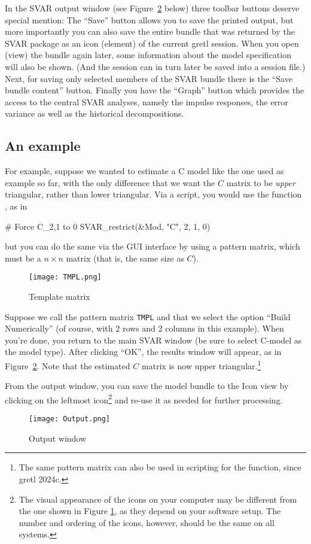 \documentclass[a4paper,10pt]{article}
\newcommand{\app}[1]{\textsf{#1}}
\newcommand{\dtk}[1]{\texttt{\detokenize{#1}}}
\newcounter{script}[section]
\begin{document}
In the SVAR output window (see Figure~\ref{fig:GUI-output} below)
three toolbar buttons deserve special mention: The ``Save'' button
allows you to save the printed output, but more importantly you can
also save the entire bundle that was returned by the SVAR package as
an icon (element) of the current \app{gretl} session. When you open
(view) the bundle again later, some information about the model
specification will also be shown. (And the session can in turn later
be saved into a session file.) Next, for saving only selected members
of the SVAR bundle there is the ``Save bundle content''
button. Finally you have the ``Graph'' button which provides the
access to the central SVAR analyses, namely the impulse responses, the
error variance as well as the historical decompositions.

\subsection{An example}

For example, suppose we wanted to estimate a C model like the one used
as example so far, with the only difference that we want the $C$
matrix to be \emph{upper} triangular, rather than lower
triangular. Via a script, you would use the function
\dtk{SVAR_restrict()}, as in
\begin{code}
# Force C_{2,1} to 0
SVAR_restrict(&Mod, "C", 2, 1, 0)
\end{code}
but you can do the same via the GUI interface by using a pattern
matrix, which must be a $n \times n$ matrix (that is, the same
size as $C$). 

\begin{figure}[htbp]
  \centering
  \texttt{[image: TMPL.png]}
  \caption{Template matrix}
  \label{fig:tmpl}
\end{figure}

Suppose we call the pattern matrix \texttt{TMPL} and that we select
the option ``Build Numerically'' (of course, with 2 rows and 2 columns
in this example).  When you're done, you return to the main SVAR
window (be sure to select C-model as the model type). After clicking
``OK'', the results window will appear, as in
Figure~\ref{fig:GUI-output}. Note that the estimated $C$ matrix is now
upper triangular.\footnote{The same pattern matrix can also be used 
in scripting for the \dtk{SVAR_restrict()} function, since gretl 2024c.}

From the output window, you can save the model bundle to the Icon view
by clicking on the leftmost icon\footnote{The visual appearance of the
  icons on your computer may be different from the one shown in Figure
  \ref{fig:tmpl}, as they depend on your software setup.  The number
  and ordering of the icons, however, should be the same on all
  systems.} and re-use it as needed for further processing.
\begin{figure}[htbp]
  \centering
  \texttt{[image: Output.png]}
  \caption{Output window}
  \label{fig:GUI-output}
\end{figure}
\end{document}
